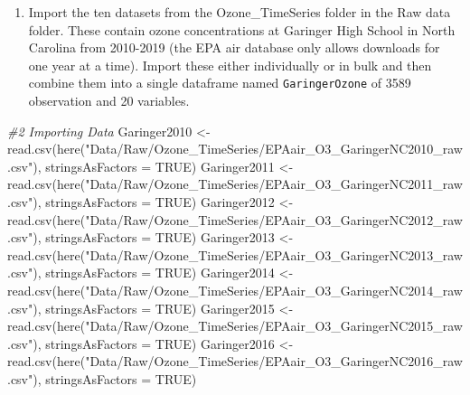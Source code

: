 \documentclass[
]{article}
\newenvironment{Shaded}{\begin{snugshade}}{\end{snugshade}}
\newcommand{\AttributeTok}[1]{\textcolor[rgb]{0.77,0.63,0.00}{#1}}
\newcommand{\CommentTok}[1]{\textcolor[rgb]{0.56,0.35,0.01}{\textit{#1}}}
\newcommand{\ConstantTok}[1]{\textcolor[rgb]{0.00,0.00,0.00}{#1}}
\newcommand{\FunctionTok}[1]{\textcolor[rgb]{0.00,0.00,0.00}{#1}}
\newcommand{\NormalTok}[1]{#1}
\newcommand{\OtherTok}[1]{\textcolor[rgb]{0.56,0.35,0.01}{#1}}
\newcommand{\StringTok}[1]{\textcolor[rgb]{0.31,0.60,0.02}{#1}}
\providecommand{\tightlist}{%
  \setlength{\itemsep}{0pt}\setlength{\parskip}{0pt}}
\begin{document}
\begin{enumerate}
\def\labelenumi{\arabic{enumi}.}
\setcounter{enumi}{1}
\tightlist
\item
  Import the ten datasets from the Ozone\_TimeSeries folder in the Raw
  data folder. These contain ozone concentrations at Garinger High
  School in North Carolina from 2010-2019 (the EPA air database only
  allows downloads for one year at a time). Import these either
  individually or in bulk and then combine them into a single dataframe
  named \texttt{GaringerOzone} of 3589 observation and 20 variables.
\end{enumerate}

\begin{Shaded}
\begin{Highlighting}[]
\CommentTok{\#2 Importing Data}
\NormalTok{Garinger2010 }\OtherTok{\textless{}{-}} \FunctionTok{read.csv}\NormalTok{(}\FunctionTok{here}\NormalTok{(}\StringTok{"Data/Raw/Ozone\_TimeSeries/EPAair\_O3\_GaringerNC2010\_raw.csv"}\NormalTok{), }\AttributeTok{stringsAsFactors =} \ConstantTok{TRUE}\NormalTok{)}
\NormalTok{Garinger2011 }\OtherTok{\textless{}{-}} \FunctionTok{read.csv}\NormalTok{(}\FunctionTok{here}\NormalTok{(}\StringTok{"Data/Raw/Ozone\_TimeSeries/EPAair\_O3\_GaringerNC2011\_raw.csv"}\NormalTok{), }\AttributeTok{stringsAsFactors =} \ConstantTok{TRUE}\NormalTok{)}
\NormalTok{Garinger2012 }\OtherTok{\textless{}{-}} \FunctionTok{read.csv}\NormalTok{(}\FunctionTok{here}\NormalTok{(}\StringTok{"Data/Raw/Ozone\_TimeSeries/EPAair\_O3\_GaringerNC2012\_raw.csv"}\NormalTok{), }\AttributeTok{stringsAsFactors =} \ConstantTok{TRUE}\NormalTok{)}
\NormalTok{Garinger2013 }\OtherTok{\textless{}{-}} \FunctionTok{read.csv}\NormalTok{(}\FunctionTok{here}\NormalTok{(}\StringTok{"Data/Raw/Ozone\_TimeSeries/EPAair\_O3\_GaringerNC2013\_raw.csv"}\NormalTok{), }\AttributeTok{stringsAsFactors =} \ConstantTok{TRUE}\NormalTok{)}
\NormalTok{Garinger2014 }\OtherTok{\textless{}{-}} \FunctionTok{read.csv}\NormalTok{(}\FunctionTok{here}\NormalTok{(}\StringTok{"Data/Raw/Ozone\_TimeSeries/EPAair\_O3\_GaringerNC2014\_raw.csv"}\NormalTok{), }\AttributeTok{stringsAsFactors =} \ConstantTok{TRUE}\NormalTok{)}
\NormalTok{Garinger2015 }\OtherTok{\textless{}{-}} \FunctionTok{read.csv}\NormalTok{(}\FunctionTok{here}\NormalTok{(}\StringTok{"Data/Raw/Ozone\_TimeSeries/EPAair\_O3\_GaringerNC2015\_raw.csv"}\NormalTok{), }\AttributeTok{stringsAsFactors =} \ConstantTok{TRUE}\NormalTok{)}
\NormalTok{Garinger2016 }\OtherTok{\textless{}{-}} \FunctionTok{read.csv}\NormalTok{(}\FunctionTok{here}\NormalTok{(}\StringTok{"Data/Raw/Ozone\_TimeSeries/EPAair\_O3\_GaringerNC2016\_raw.csv"}\NormalTok{), }\AttributeTok{stringsAsFactors =} \ConstantTok{TRUE}\NormalTok{)}

\end{Highlighting}
\end{Shaded}
\end{document}
